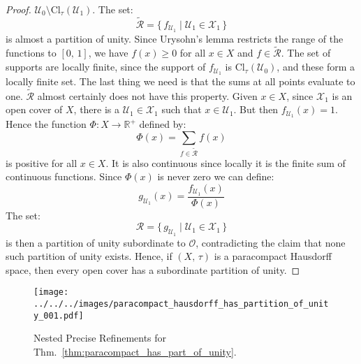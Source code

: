 \documentclass{article}
\theoremstyle{plain}
\theoremstyle{normal}
\begin{document}
\begin{proof}
            $\mathcal{U}_{0}\setminus\textrm{Cl}_{\tau}(\mathcal{U}_{1})$. The
            set:
            \begin{equation}
                \tilde{\mathcal{R}}=
                \{\,f_{\mathcal{U}_{1}}\;|\;
                    \mathcal{U}_{1}\in\mathcal{X}_{1}\,\}
            \end{equation}
            is almost a partition of unity. Since Urysohn's lemma restricts the
            range of the functions to $[0,\,1]$, we have $f(x)\geq{0}$ for all
            $x\in{X}$ and $f\in\tilde{\mathcal{R}}$. The set of supports are
            locally finite, since the support of
            $f_{\mathcal{U}_{1}}$ is $\textrm{Cl}_{\tau}(\mathcal{U}_{0})$,
            and these form a locally finite set. The last thing we need is
            that the sums at all points evaluate to one. $\tilde{\mathcal{R}}$
            almost certainly does not have this property. Given $x\in{X}$, since
            $\mathcal{X}_{1}$ is an open cover of $X$, there is a
            $\mathcal{U}_{1}\in\mathcal{X}_{1}$ such that $x\in\mathcal{U}_{1}$.
            But then $f_{\mathcal{U}_{1}}(x)=1$. Hence the function
            $\Phi:X\rightarrow\mathbb{R}^{+}$ defined by:
            \begin{equation}
                \Phi(x)=\sum_{f\in\tilde{\mathcal{R}}}f(x)
            \end{equation}
            is positive for all $x\in{X}$. It is also continuous since locally
            it is the finite sum of continuous functions. Since $\Phi(x)$ is
            never zero we can define:
            \begin{equation}
                g_{\mathcal{U}_{1}}(x)
                =\frac{f_{\mathcal{U}_{1}}(x)}{\Phi(x)}
            \end{equation}
            The set:
            \begin{equation}
                \mathcal{R}
                =\{\,g_{\mathcal{U}_{1}}\;|\;
                    \mathcal{U}_{1}\in\mathcal{X}_{1}\,\}
            \end{equation}
            is then a partition of unity subordinate to $\mathcal{O}$,
            contradicting the claim that none such partition of unity exists.
            Hence, if $(X,\,\tau)$ is a paracompact Hausdorff space, then
            every open cover has a subordinate partition of unity.
        \end{proof}
        \begin{figure}
            \centering
            \texttt{[image: ../../../images/paracompact\_hausdorff\_has\_partition\_of\_unity\_001.pdf]}
            \caption{Nested Precise Refinements for Thm.~\ref{thm:paracompact_has_part_of_unity}.}
            \label{fig:paracompact_has_part_of_unity}
        \end{figure}
\end{document}
